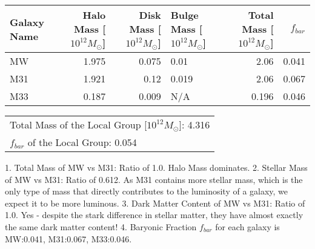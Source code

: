 \documentclass{article}
\begin{document}
 
\begin{tabular}{lrrlrr}
\hline
 Galaxy Name   &   Halo Mass [$10^{12} M_\odot$] &   Disk Mass [$10^{12} M_\odot$] & Bulge Mass [$10^{12} M_\odot$]   &   Total Mass [$10^{12} M_\odot$] &   $f_{bar}$ \\
\hline
 MW            &                           1.975 &                           0.075 & 0.01                             &                            2.06  &       0.041 \\
 M31           &                           1.921 &                           0.12  & 0.019                            &                            2.06  &       0.067 \\
 M33           &                           0.187 &                           0.009 & N/A                              &                            0.196 &       0.046 \\
\hline
\end{tabular}

\begin{tabular}{l}
\hline
 Total Mass of the Local Group [$10^{12} M_\odot$]: 4.316 \\
 $f_{bar}$ of the Local Group: 0.054                      \\
\hline
\end{tabular}
 1. Total Mass of MW vs M31: Ratio of 1.0. Halo Mass dominates.
 2. Stellar Mass of MW vs M31: Ratio of 0.612. As M31 contains more stellar mass, which is the only type of mass that directly contributes to the luminosity of a galaxy, we expect it to be more luminous.
 3. Dark Matter Content of MW vs M31: Ratio of 1.0. Yes - despite the stark difference in stellar matter, they have almost exactly the same dark matter content!
 4. Baryonic Fraction $f_{bar}$ for each galaxy is MW:0.041, M31:0.067, M33:0.046.
 
\end{document}
